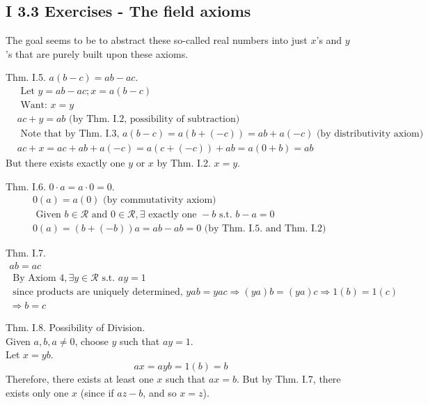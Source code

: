 \documentclass[twoside]{amsart}
\theoremstyle{plain}
\theoremstyle{definition}
\newcommand{\exercisehead}[1]
  {\smallskip
   \noindent{\small\bf Exercise #1.}}
\begin{document}
\subsection*{I 3.3 Exercises - The field axioms }

The goal seems to be to abstract these so-called real numbers into just $x$'s and $y$'s that are purely built upon these axioms.  

\exercisehead{1}
Thm. I.5. $a(b-c)=ab-ac$.  
\[
\begin{aligned}
  & \text{ Let } y = ab-ac; x = a(b-c) \\
  & \text{ Want: } x = y \\
  & ac + y = ab \text{ (by Thm. I.2, possibility of subtraction) } \\
  & \text{ Note that by Thm. I.3, } a(b-c) = a(b+ (-c)) = ab + a(-c) \text{ (by distributivity axiom) } \\
  & ac + x = ac + ab + a(-c) = a(c + (-c)) + ab = a( 0+b) = ab 
\end{aligned}
\]
But there exists exactly one $y$ or $x$ by Thm. I.2.  $x=y$.  

Thm. I.6.  $0 \cdot a = a \cdot 0 = 0 $.  
\[
\begin{gathered}
0 (a) = a(0) \text{ (by commutativity axiom) } \\
\text{ Given } b \in \mathcal{R} \text{ and } 0 \in \mathcal{R}, \exists \text{ exactly one } -b \text{ s.t. } b -a =0 \\
0 (a) = (b + (-b)) a = ab -ab = 0 \text{ (by Thm. I.5. and Thm. I.2) } 
\end{gathered}
\]

Thm. I.7. 
\[
\begin{gathered}
ab = ac \\
\text{ By Axiom 4}, \exists y \in \mathcal{R} \text{ s.t. } ay = 1 \\
\text{ since products are uniquely determined, } yab= y ac \Longrightarrow (ya)b = (ya) c \Longrightarrow 1 (b) = 1 (c) \\
\Longrightarrow b = c
\end{gathered}
\]

Thm. I.8. Possibility of Division.  \\
Given $a,b, a\neq 0$, choose $y$ such that $ay = 1$.  \\
Let $x=yb$.  
\[
ax = ayb = 1(b) = b
\]
Therefore, there exists at least one $x$ such that $ax =b$.  But by Thm. I.7, there exists only one $x$ (since if $az-b$, and so $x=z$).  
\end{document}
